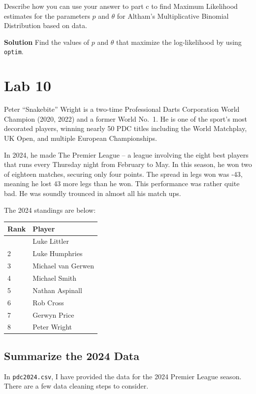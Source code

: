 \documentclass[
]{article}
\newcounter{none} %
\begin{document}
Describe how you can use your answer to part c to find Maximum
Likelihood estimates for the parameters \(p\) and \(\theta\) for
Altham's Multiplicative Binomial Distribution based on data.

\textbf{Solution} Find the values of \(p\) and \(\theta\) that maximize
the log-likelihood by using \texttt{optim}.

\section{Lab 10}\label{lab-10}

Peter ``Snakebite'' Wright is a two-time Professional Darts Corporation
World Champion (2020, 2022) and a former World No.~1. He is one of the
sport's most decorated players, winning nearly 50 PDC titles including
the World Matchplay, UK Open, and multiple European Championships.

In 2024, he made The Premier League -- a league involving the eight best
players that runs every Thursday night from February to May. In this
season, he won two of eighteen matches, securing only four points. The
spread in legs won was -43, meaning he lost 43 more legs than he won.
This performance was rather quite bad. He was soundly trounced in almost
all his match ups.

The 2024 standings are below:

{\def\LTcaptype{none} %
\begin{longtable}[]{@{}ll@{}}
\toprule\noalign{}
Rank & Player \\
\midrule\noalign{}
\endhead
\bottomrule\noalign{}
\endlastfoot
1 & Luke Littler \\
2 & Luke Humphries \\
3 & Michael van Gerwen \\
4 & Michael Smith \\
5 & Nathan Aspinall \\
6 & Rob Cross \\
7 & Gerwyn Price \\
8 & Peter Wright \\
\end{longtable}
}

\subsection{Summarize the 2024 Data}\label{summarize-the-2024-data}

In \texttt{pdc2024.csv}, I have provided the data for the 2024 Premier
League season. There are a few data cleaning steps to consider.
\end{document}
